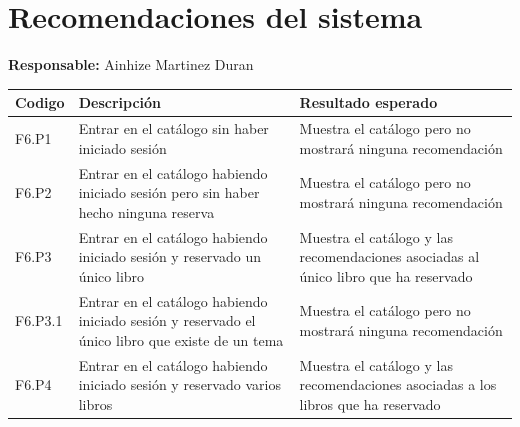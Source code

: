 ﻿\documentclass{report}
\begin{document}
        \section{Recomendaciones del sistema}
            \begin{center}
                \textbf{Responsable:} Ainhize Martinez Duran\\
                \begin{longtable}{|m{2cm}|m{4cm}|m{4cm}|}
                    \hline
                    Codigo & Descripción & Resultado esperado \\
                    \hline
                    \endhead
                    \hline
                    F6.P1 & Entrar en el catálogo sin haber iniciado sesión & Muestra el catálogo pero no mostrará ninguna recomendación \\
                    \hline
                    F6.P2 & Entrar en el catálogo habiendo iniciado sesión pero sin haber hecho ninguna reserva & Muestra el catálogo pero no mostrará ninguna recomendación \\
                    \hline
                    F6.P3 & Entrar en el catálogo habiendo iniciado sesión y reservado un único libro & Muestra el catálogo y las recomendaciones asociadas al único libro que ha reservado \\
                    \hline
                    F6.P3.1 & Entrar en el catálogo habiendo iniciado sesión y reservado el único libro que existe de un tema & Muestra el catálogo pero no mostrará ninguna recomendación \\
                    \hline
                    F6.P4 & Entrar en el catálogo habiendo iniciado sesión y reservado varios libros & Muestra el catálogo y las recomendaciones asociadas a los libros que ha reservado \\
                    \hline
                \end{longtable}
            \end{center}
            \clearpage
\end{document}
